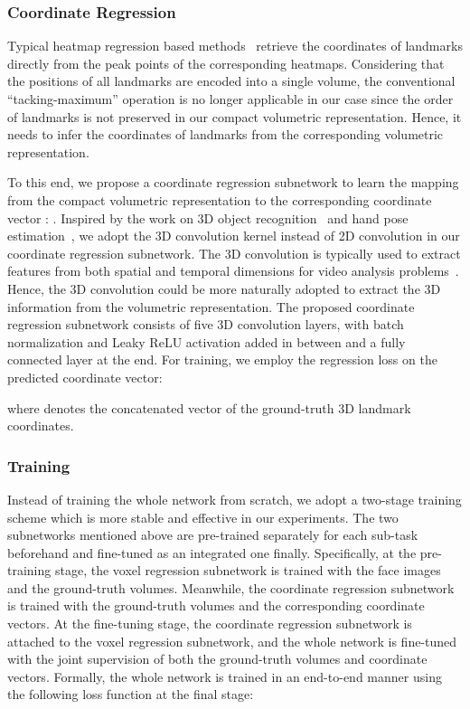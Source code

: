 \documentclass[a4paper,conference]{IEEEtran}
\begin{document}
\subsubsection{Coordinate Regression}

Typical heatmap regression based methods~\cite{bulat2016convolutional,wei2016convolutional,newell2016stacked} retrieve the coordinates of landmarks directly from the peak points of the corresponding heatmaps.
Considering that the positions of all landmarks are encoded into a single volume, the conventional ``tacking-maximum'' operation is no longer applicable in our case since the order of landmarks is not preserved in our compact volumetric representation. 
Hence, it needs to infer the coordinates of landmarks from the corresponding volumetric representation.

To this end, we propose a coordinate regression subnetwork  to learn the mapping from the compact volumetric representation  to the corresponding coordinate vector :
.
Inspired by the work on 3D object recognition~\cite{wu20153d} and hand pose estimation~\cite{ge20173d}, we adopt the 3D convolution kernel instead of 2D convolution in our coordinate regression subnetwork.
The 3D convolution is typically used to extract features from both spatial and temporal dimensions for video analysis problems~\cite{ji20133d}.
Hence, the 3D convolution could be more naturally adopted to extract the 3D information from the volumetric representation.
The proposed coordinate regression subnetwork consists of five 3D convolution layers, with batch normalization and Leaky ReLU activation added in between and a fully connected layer at the end.
For training, we employ the  regression loss on the predicted coordinate vector:

where  denotes the concatenated vector of the ground-truth 3D landmark coordinates.

\subsubsection{Training}
Instead of training the whole network from scratch, we adopt a two-stage training scheme which is more stable and effective in our experiments.
The two subnetworks mentioned above are pre-trained separately for each sub-task beforehand and fine-tuned as an integrated one finally.
Specifically, at the pre-training stage, the voxel regression subnetwork is trained with the face images and the ground-truth volumes.
Meanwhile, the coordinate regression subnetwork is trained with the ground-truth volumes and the corresponding coordinate vectors.
At the fine-tuning stage, the coordinate regression subnetwork is attached to the voxel regression subnetwork, and the whole network is fine-tuned with the joint supervision of both the ground-truth volumes and coordinate vectors.
Formally, the whole network is trained in an end-to-end manner using the following loss function at the final stage:
\end{document}
